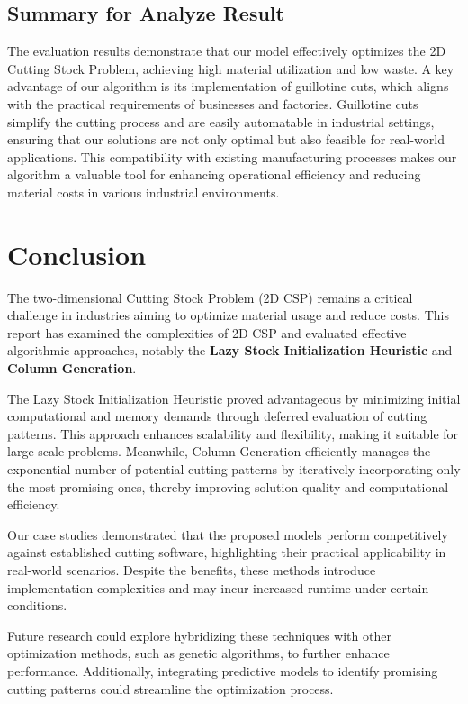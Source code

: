 \documentclass[a4paper]{article}
\begin{document}
\subsection*{Summary for Analyze Result}

The evaluation results demonstrate that our model effectively optimizes the 2D Cutting Stock Problem, achieving high material utilization and low waste. A key advantage of our algorithm is its implementation of guillotine cuts, which aligns with the practical requirements of businesses and factories. Guillotine cuts simplify the cutting process and are easily automatable in industrial settings, ensuring that our solutions are not only optimal but also feasible for real-world applications. This compatibility with existing manufacturing processes makes our algorithm a valuable tool for enhancing operational efficiency and reducing material costs in various industrial environments.
\section{Conclusion}

The two-dimensional Cutting Stock Problem (2D CSP) remains a critical challenge in industries aiming to optimize material usage and reduce costs. This report has examined the complexities of 2D CSP and evaluated effective algorithmic approaches, notably the \textbf{Lazy Stock Initialization Heuristic} and \textbf{Column Generation}.

The Lazy Stock Initialization Heuristic proved advantageous by minimizing initial computational and memory demands through deferred evaluation of cutting patterns. This approach enhances scalability and flexibility, making it suitable for large-scale problems. Meanwhile, Column Generation efficiently manages the exponential number of potential cutting patterns by iteratively incorporating only the most promising ones, thereby improving solution quality and computational efficiency.

Our case studies demonstrated that the proposed models perform competitively against established cutting software, highlighting their practical applicability in real-world scenarios. Despite the benefits, these methods introduce implementation complexities and may incur increased runtime under certain conditions.

Future research could explore hybridizing these techniques with other optimization methods, such as genetic algorithms, to further enhance performance. Additionally, integrating predictive models to identify promising cutting patterns could streamline the optimization process.
\end{document}
